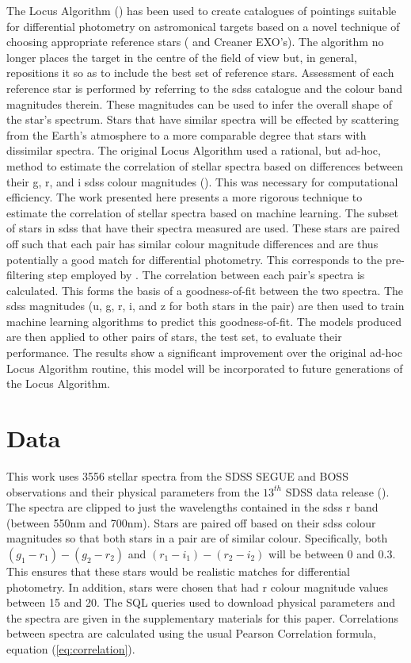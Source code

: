 \documentclass[preprint, 3p,
authoryear]{elsarticle} %
\begin{document}
The Locus Algorithm (\citet{creaner2022}) has been used to create
catalogues of pointings suitable for differential photometry on
astromonical targets based on a novel technique of choosing appropriate
reference stars (\citet{creaner2020} and Creaner EXO's). The algorithm
no longer places the target in the centre of the field of view but, in
general, repositions it so as to include the best set of reference
stars. Assessment of each reference star is performed by referring to
the sdss catalogue and the colour band magnitudes therein. These
magnitudes can be used to infer the overall shape of the star's
spectrum. Stars that have similar spectra will be effected by scattering
from the Earth's atmosphere to a more comparable degree that stars with
dissimilar spectra. The original Locus Algorithm used a rational, but
ad-hoc, method to estimate the correlation of stellar spectra based on
differences between their g, r, and i sdss colour magnitudes
(\citet{Creaner2017}). This was necessary for computational efficiency.
The work presented here presents a more rigorous technique to estimate
the correlation of stellar spectra based on machine learning. The subset
of stars in sdss that have their spectra measured are used. These stars
are paired off such that each pair has similar colour magnitude
differences and are thus potentially a good match for differential
photometry. This corresponds to the pre-filtering step employed by
\citet{Creaner2017}. The correlation between each pair's spectra is
calculated. This forms the basis of a goodness-of-fit between the two
spectra. The sdss magnitudes (u, g, r, i, and z for both stars in the
pair) are then used to train machine learning algorithms to predict this
goodness-of-fit. The models produced are then applied to other pairs of
stars, the test set, to evaluate their performance. The results show a
significant improvement over the original ad-hoc Locus Algorithm
routine, this model will be incorporated to future generations of the
Locus Algorithm.

\hypertarget{data}{%
\section{Data}\label{data}}

This work uses 3556 stellar spectra from the SDSS SEGUE and BOSS
observations and their physical parameters from the \(13^{th}\) SDSS
data release (\citet{Aguado2018}). The spectra are clipped to just the
wavelengths contained in the sdss r band (between 550nm and 700nm).
Stars are paired off based on their sdss colour magnitudes so that both
stars in a pair are of similar colour. Specifically, both
\((g_1-r_1)-(g_2-r_2)\) and \((r_1-i_1)-(r_2-i_2)\) will be between 0
and 0.3. This ensures that these stars would be realistic matches for
differential photometry. In addition, stars were chosen that had r
colour magnitude values between 15 and 20. The SQL queries used to
download physical parameters and the spectra are given in the
supplementary materials for this paper. Correlations between spectra are
calculated using the usual Pearson Correlation formula, equation
(\ref{eq:correlation}).
\end{document}
